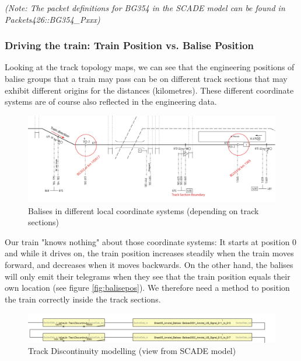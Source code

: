 \documentclass{template/openetcs_article}
\begin{document}
\emph{(Note: The packet definitions for BG354 in the SCADE model can be found in Packets426::BG354\_Pxxx)}

\subsubsection{Driving the train: Train Position vs. Balise Position}

Looking at the track topology maps, we can see that the engineering positions of balise groups that a train may pass can be on different track sections that may exhibit different origins for the distances (kilometres). These different coordinate systems are of course also reflected in the engineering data.

\begin{figure}[H]
  \centering
  \includegraphics[width=\textwidth]{images/CoordJump}
   \caption{Balises in different local coordinate systems (depending on track sections)}
  \label{fig:balisecoord}
\end{figure}

Our train "knows nothing" about those coordinate systems: It starts at position 0 and while it drives on, the train position increases steadily when the train moves forward, and decreases when it moves backwards.\newline
On the other hand, the balises will only emit their telegrams when they see that the train position equals their own location (see figure \ref{fig:balisepos}).\newline
We therefore need a method to position the train correctly inside the track sections.

\begin{figure}[H]
  \centering
  \includegraphics[width=\textwidth]{images/TrackDiscont}
   \caption{Track Discontinuity modelling (view from SCADE model)}
  \label{fig:trackjump}
\end{figure}
\end{document}
